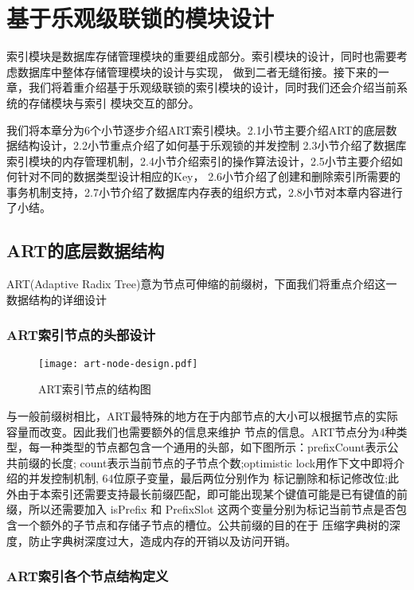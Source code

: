 
\chapter{基于乐观级联锁的模块设计}

索引模块是数据库存储管理模块的重要组成部分。索引模块的设计，同时也需要考虑数据库中整体存储管理模块的设计与实现，
做到二者无缝衔接。接下来的一章，我们将着重介绍基于乐观级联锁的索引模块的设计，同时我们还会介绍当前系统的存储模块与索引
模块交互的部分。

我们将本章分为6个小节逐步介绍ART索引模块。2.1小节主要介绍ART的底层数据结构设计，2.2小节重点介绍了如何基于乐观锁的并发控制
2.3小节介绍了数据库索引模块的内存管理机制，2.4小节介绍索引的操作算法设计，2.5小节主要介绍如何针对不同的数据类型设计相应的Key，
2.6小节介绍了创建和删除索引所需要的事务机制支持，2.7小节介绍了数据库内存表的组织方式，2.8小节对本章内容进行了小结。

\section{ART的底层数据结构}

ART(Adaptive Radix Tree)意为节点可伸缩的前缀树，下面我们将重点介绍这一数据结构的详细设计

\subsection{ART索引节点的头部设计}

\begin{figure}[h]
  \centering
  \texttt{[image: art-node-design.pdf]}
  \caption{ART索引节点的结构图}
  \label{fig:art-node-design}
\end{figure}

与一般前缀树相比，ART最特殊的地方在于内部节点的大小可以根据节点的实际容量而改变。因此我们也需要额外的信息来维护
节点的信息。ART节点分为4种类型，每一种类型的节点都包含一个通用的头部，如下图所示：prefixCount表示公共前缀的长度;
count表示当前节点的子节点个数;optimistic lock用作下文中即将介绍的并发控制机制, 64位原子变量，最后两位分别作为
标记删除和标记修改位;此外由于本索引还需要支持最长前缀匹配，即可能出现某个键值可能是已有键值的前缀，所以还需要加入
isPrefix 和 PrefixSlot 这两个变量分别为标记当前节点是否包含一个额外的子节点和存储子节点的槽位。公共前缀的目的在于
压缩字典树的深度，防止字典树深度过大，造成内存的开销以及访问开销。

\subsection{ART索引各个节点结构定义}


